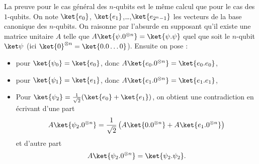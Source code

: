 \documentclass[11pt,class=report,crop=false]{standalone}
\begin{document}
La preuve pour le cas général des $n$-qubits est le même calcul que pour le cas des $1$-qubits.
On note $\ket{e_0}$, $\ket{e_1}$,\ldots,$\ket{e_{2^n-1}}$ les vecteurs de la base canonique des $n$-qubits. 
On raisonne par l'absurde en supposant qu'il existe une matrice unitaire $A$ telle que 
$A \ket{\psi.0^{\otimes n}} = \ket{\psi.\psi}$ quel que soit le $n$-qubit $\ket\psi$ (ici $\ket{0}^{\otimes n} = \ket{0.0\ldots0}$).
Ensuite on pose :
\begin{itemize}
  \item pour $\ket{\psi_0} = \ket{e_0}$, donc $A\ket{e_0.0^{\otimes n}} = \ket{e_0.e_0}$,
  \item pour $\ket{\psi_1} = \ket{e_1}$, donc $A\ket{e_1.0^{\otimes n}} = \ket{e_1.e_1}$,
  \item Pour $\ket{\psi_2} =  \frac1{\sqrt2} (\ket{e_0}+\ket{e_1})$, 
    on obtient une contradiction en écrivant d'une part
    $$A\ket{\psi_2.0^{\otimes n}} 
  = \frac1{\sqrt2} \left(A \ket{0.0^{\otimes n}} +A \ket{e_1.0^{\otimes n}}\right) $$ et d'autre part $$A\ket{\psi_2.0^{\otimes n}} = \ket{\psi_2.\psi_2}.$$
\end{itemize}
\end{document}
